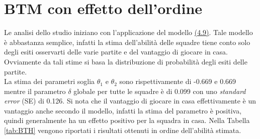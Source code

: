 \section{BTM con effetto dell'ordine}
Le analisi dello studio iniziano con l'applicazione del modello \hyperref[for:3.9]{(4.9)}. Tale modello è abbastanza semplice, infatti la stima dell'abilità delle squadre tiene conto solo degli esiti osservarti delle varie partite e del vantaggio di giocare in casa. Ovviamente da tali stime si basa la distribuzione di probabilità degli esiti delle partite.\\
La stima dei parametri soglia $\theta_1$ e $\theta_2$ sono rispettivamente di -0.669 e 0.669 mentre il parametro $\delta$ globale per tutte le squadre è di 0.099 con uno \emph{standard error} (SE) di 0.126. Si nota che il vantaggio di giocare in casa effettivamente è un vantaggio anche secondo il modello, infatti la stima del parametro è positiva, quindi generalmente ha un effetto positivo per la squadra in casa. Nella Tabella \ref{tab:BTH} vengono riportati i risultati ottenuti in ordine dell'abilità stimata.\\

